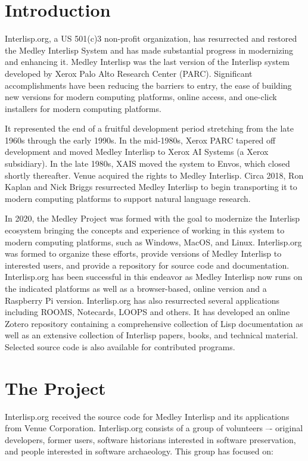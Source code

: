 \documentclass[sigconf]{acmart}
\begin{document}
\section{Introduction}
Interlisp.org, a US 501(c)3 non-profit organization, has resurrected and restored the Medley Interlisp System and has made substantial progress in modernizing and enhancing it. Medley Interlisp was the last version of the Interlisp system developed by Xerox Palo Alto Research Center (PARC). Significant accomplishments have been reducing the barriers to entry, the ease of building new versions for modern computing platforms, online access, and one-click installers for modern computing platforms.

It represented the end of a fruitful development period stretching from the late 1960s through the early 1990s. In the mid-1980s, Xerox PARC tapered off development and moved Medley Interlisp to Xerox AI Systems (a Xerox subsidiary). In the late 1980s, XAIS moved the system to Envos, which closed shortly thereafter. Venue acquired the rights to Medley Interlisp. Circa 2018, Ron Kaplan and Nick Briggs resurrected Medley Interlisp to begin transporting it to modern computing platforms to support natural language research.

In 2020, the Medley Project was formed with the goal to modernize the Interlisp ecosystem bringing the concepts and experience of working in this system to modern computing platforms, such as Windows, MacOS, and Linux. Interlisp.org was formed to organize these efforts, provide versions of Medley Interlisp to interested users, and provide a repository for source code and documentation. Interlisp.org has been successful in this endeavor as Medley Interlisp now runs on the indicated platforms as well as a browser-based, online version and a Raspberry Pi version. Interlisp.org has also resurrected several applications including ROOMS, Notecards, LOOPS and others. It has developed an online Zotero repository containing a comprehensive collection of Lisp documentation as well as an extensive collection of Interlisp papers, books, and technical material. Selected source code is also available for contributed programs.

\section{The Project}

Interlisp.org received the source code for Medley Interlisp and its applications from Venue Corporation. Interlisp.org consists of a group of volunteers –- original developers, former users, software historians interested in software preservation, and people interested in software archaeology. This group has focused on:
\end{document}
